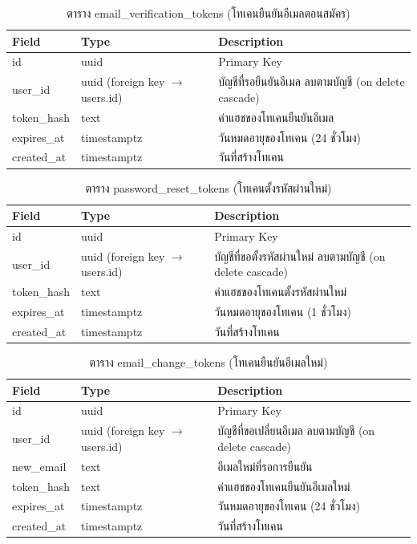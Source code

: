 \begin{table}[H]
\centering
\caption{ตาราง email\_verification\_tokens (โทเคนยืนยันอีเมลตอนสมัคร)}
\label{tab:db_evtokens}
\begin{tabular}{|p{3.6cm}|p{2.6cm}|p{6.8cm}|}
\hline
\textbf{Field} & \textbf{Type} & \textbf{Description} \\
\hline
id & uuid & Primary Key \\ \hline
user\_id & uuid (foreign key $\to$ users.id) & บัญชีที่รอยืนยันอีเมล ลบตามบัญชี (on delete cascade) \\ \hline
token\_hash & text & ค่าแฮชของโทเคนยืนยันอีเมล \\ \hline
expires\_at & timestamptz & วันหมดอายุของโทเคน (24 ชั่วโมง) \\ \hline
created\_at & timestamptz & วันที่สร้างโทเคน \\
\hline
\end{tabular}
\end{table}

\begin{table}[H]
\centering
\caption{ตาราง password\_reset\_tokens (โทเคนตั้งรหัสผ่านใหม่)}
\label{tab:db_prtokens}
\begin{tabular}{|p{3.6cm}|p{2.6cm}|p{6.8cm}|}
\hline
\textbf{Field} & \textbf{Type} & \textbf{Description} \\
\hline
id & uuid & Primary Key \\ \hline
user\_id & uuid (foreign key $\to$ users.id) & บัญชีที่ขอตั้งรหัสผ่านใหม่ ลบตามบัญชี (on delete cascade) \\ \hline
token\_hash & text & ค่าแฮชของโทเคนตั้งรหัสผ่านใหม่ \\ \hline
expires\_at & timestamptz & วันหมดอายุของโทเคน (1 ชั่วโมง) \\ \hline
created\_at & timestamptz & วันที่สร้างโทเคน \\
\hline
\end{tabular}
\end{table}

\begin{table}[H]
\centering
\caption{ตาราง email\_change\_tokens (โทเคนยืนยันอีเมลใหม่)}
\label{tab:db_ectokens}
\begin{tabular}{|p{3.6cm}|p{2.6cm}|p{6.8cm}|}
\hline
\textbf{Field} & \textbf{Type} & \textbf{Description} \\
\hline
id & uuid & Primary Key \\ \hline
user\_id & uuid (foreign key $\to$ users.id) & บัญชีที่ขอเปลี่ยนอีเมล ลบตามบัญชี (on delete cascade) \\ \hline
new\_email & text & อีเมลใหม่ที่รอการยืนยัน \\ \hline
token\_hash & text & ค่าแฮชของโทเคนยืนยันอีเมลใหม่ \\ \hline
expires\_at & timestamptz & วันหมดอายุของโทเคน (24 ชั่วโมง) \\ \hline
created\_at & timestamptz & วันที่สร้างโทเคน \\
\hline
\end{tabular}
\end{table}

